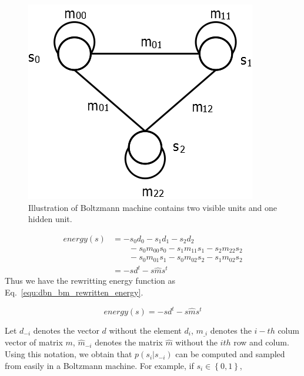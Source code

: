 \documentclass[runningheads,openany]{xhlPaper}
\begin{document}
\begin{figure}
\centering
\includegraphics[width=0.6\linewidth]{dbn_bm_example_three_units}
\caption{Illustration of Boltzmann machine contains two visible units and one hidden unit.}
\label{fig:dbn_bm_example_three_units}
\end{figure}


\begin{displaymath}
\label{equ:dbn_bm_example_rewritten_energy_three_units}
\begin{aligned}
energy\left( s \right) &=  - {s_0}{d_0} - {s_1}{d_1} - {s_2}{d_2}\\
 &\quad\quad - {s_0}{m_{00}}{s_0} - {s_1}{m_{11}}{s_1} - {s_2}{m_{22}}{s_2}\\
 &\quad\quad - {s_0}{m_{01}}{s_1} - {s_0}{m_{02}}{s_2} - {s_1}{m_{02}}s{}_2\\
 &=  - s{d^t} - s\hat m{s^t}
\end{aligned}
\end{displaymath}
Thus we have the rewritting energy function as Eq.~\ref{equ:dbn_bm_rewritten_energy}.

\begin{equation}
\label{equ:dbn_bm_rewritten_energy}
energy\left( s \right) =  - s{d^t} - s\hat m{s^t}
\end{equation}

Let $d_{-i}$ denotes the vector $d$ without the element $d_i$, 
${{m_{\_i}}}$ denotes the $i-th$ colum vector of matrix $m$,
${{{\hat m}_{ - i}}}$ denotes the matrix $\hat m$ without the $ith$ row and colum.
Using this notation, we obtain that $p\left(s_{i}|s_{-i}\right)$ can be computed and sampled from easily in a Boltzmann machine.
For example, if $s_i \in \left\{ {0, 1} \right\}$,
\end{document}
